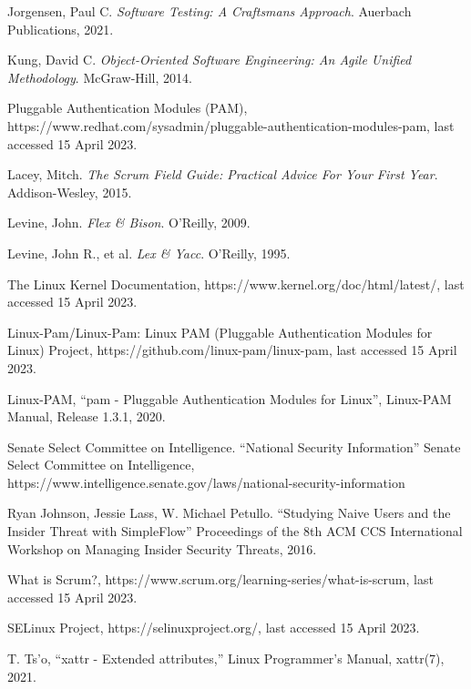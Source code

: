 \documentclass[letterpaper,12pt]{report}
\begin{document}
\begin{thebibliography}{14}

Jorgensen, Paul C. \textit{Software Testing: A Craftsmans Approach}. Auerbach Publications, 2021.

Kung, David C. \textit{Object-Oriented Software Engineering: An Agile Unified Methodology}. McGraw-Hill, 2014.

Pluggable Authentication Modules (PAM), https://www.redhat.com/sysadmin/pluggable-authentication-modules-pam, last accessed 15 April 2023.

Lacey, Mitch. \textit{The Scrum Field Guide: Practical Advice For Your First Year}. Addison-Wesley, 2015.

Levine, John. \textit{Flex \& Bison}. O'Reilly, 2009.

Levine, John R., et al. \textit{Lex \& Yacc}. O'Reilly, 1995.

The Linux Kernel Documentation, https://www.kernel.org/doc/html/latest/, last accessed 15 April 2023.

Linux-Pam/Linux-Pam: Linux PAM (Pluggable Authentication Modules for Linux) Project, https://github.com/linux-pam/linux-pam, last accessed 15 April 2023.

Linux-PAM, ``pam - Pluggable Authentication Modules for Linux'', Linux-PAM Manual, Release 1.3.1, 2020.

Senate Select Committee on Intelligence. ``National Security Information'' Senate Select Committee on Intelligence, https://www.intelligence.senate.gov/laws/national-security-information

Ryan Johnson, Jessie Lass, W. Michael Petullo. ``Studying Naive Users and the Insider Threat with SimpleFlow'' Proceedings of the 8th ACM CCS International Workshop on Managing Insider Security Threats, 2016.

What is Scrum?, https://www.scrum.org/learning-series/what-is-scrum, last accessed 15 April 2023.

SELinux Project, https://selinuxproject.org/, last accessed 15 April 2023.

T. Ts'o, ``xattr - Extended attributes,'' Linux Programmer's Manual, xattr(7), 2021.

\end{thebibliography}

\clearpage

\end{document}
